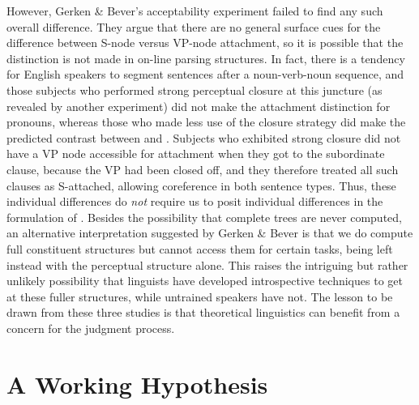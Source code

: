 However, Gerken \& Bever's acceptability experiment failed to find any such overall difference. They argue that there are no general surface cues for the difference between S-node versus VP-node attachment, so it is possible that the distinction is not made in on-line parsing structures. In fact, there is a tendency for English speakers to segment sentences after a noun-verb-noun sequence, and those subjects who performed strong perceptual closure at this juncture (as revealed by another experiment) did not make the attachment distinction for pronouns, whereas those who made less use of the closure strategy did make the predicted contrast between  and . Subjects who exhibited strong closure did not have a VP node accessible for attachment when they got to the subordinate clause, because the VP had been closed off, and they therefore treated all such clauses as S-attached, allowing coreference in both sentence types. Thus, these individual differences do \textit{not} require us to posit individual differences in the formulation of . Besides the possibility that complete trees are never computed, an alternative interpretation suggested by Gerken \& Bever is that we do compute full constituent structures but cannot access them for certain tasks, being left instead with the perceptual structure alone. This raises the intriguing but rather unlikely possibility that linguists have developed introspective techniques to get at these fuller structures, while untrained speakers have not. The lesson to be
drawn
from these three studies is that theoretical linguistics can benefit from a
concern for the  judgment process.

\section{A Working Hypothesis} \label{sec:1.4}

